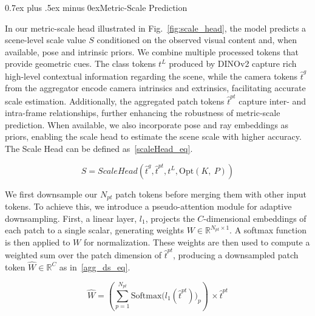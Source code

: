 \documentclass[letterpaper, 10 pt, conference]{ieeeconf}  %
\makeatletter
\renewcommand{\subsection}{\@startsection{subsection}{2}{\z@}{1.5ex plus 1.5ex minus 0.5ex}%
{0.7ex plus .5ex minus 0ex}{\normalfont\normalsize\bfseries}}
\makeatother
\begin{document}
\vspace{-1mm}
\subsection{Metric-Scale Prediction} \label{sec:metric}

In our metric-scale head illustrated in Fig.~\ref{fig:scale_head}, the model predicts a scene-level scale value $S$ conditioned on the observed visual content and, when available, pose and intrinsic priors. We combine multiple processed tokens that provide geometric cues. The class tokens $t^L$ produced by DINOv2 capture rich high-level contextual information regarding the scene, while the camera tokens $\hat{t}^{g}$ from the aggregator encode camera intrinsics and extrinsics, facilitating accurate scale estimation. Additionally, the aggregated patch tokens $\hat{t}^{pt}$ capture inter- and intra-frame relationships, further enhancing the robustness of metric-scale prediction. When available, we also incorporate pose and ray embeddings as priors, enabling the scale head to estimate the scene scale with higher accuracy. The Scale Head can be defined as~\cref{scaleHead_eq}.

\vspace{-2mm}
\begin{equation} \label{scaleHead_eq}
 S = ScaleHead\!\left(\hat{t}^{g}, \hat{t}^{pt}, t^L, \mathrm{Opt}(K,\!\ P)\right)
\end{equation}


\vspace{-1mm}

We first downsample our $N_{pt}$ patch tokens before merging them with other input tokens. To achieve this, we introduce a pseudo-attention module for adaptive downsampling. First, a linear layer, $l_1$, projects the $C$-dimensional embeddings of each patch to a single scalar, generating weights $W \in \mathbb{R}^{N_{pt} \times 1}$. A softmax function is then applied to $W$ for normalization. These weights are then used to compute a weighted sum over the patch dimension of $\hat{t}^{pt}$, producing a downsampled patch token $\hat{W} \in \mathbb{R}^{C}$ as in~\cref{agg_ds_eq}.

\vspace{-2mm}
\begin{equation} \label{agg_ds_eq}
\hat{W} = \left(\sum_{p=1}^{N_{pt}} 
    \mathrm{Softmax}\!\bigl(l_1(\hat{t}^{pt})\bigr)_p\right)\, \times \hat{t}^{pt}
\end{equation}
\vspace{-3mm}
\end{document}

